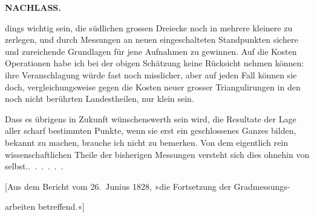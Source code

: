 \par\clearpage
\noindent{}\hfill{\small\textbf{NACHLASS.}}\hfill\null\par\medskip
\noindent dings wichtig sein, die südlichen grossen Dreiecke noch in mehrere kleinere
zu zerlegen, und durch Messungen an neuen eingeschalteten Standpunkten
sichere und zureichende Grundlagen für jene Aufnahmen zu gewinnen. Auf
die Kosten  Operationen habe ich bei der obigen Schätzung keine
Rücksicht nehmen können: ihre Veranschlagung würde fast noch misslicher,
aber auf jeden Fall können sie doch, vergleichungsweise gegen die Kosten
neuer grosser Triangulirungen in den noch nicht berührten Landestheilen, nur
klein sein.

Dass es übrigens in Zukunft wünschenswerth sein wird, die Resultate der
Lage aller scharf bestimmten Punkte, wenn sie erst ein geschlossenes Ganzes
bilden,  bekannt zu machen, brauche ich nicht zu bemerken. Von
dem eigentlich rein wissenschaftlichen Theile der bisherigen Messungen versteht
sich dies ohnehin von selbst.\quad\mbox{.\ .\ .\ .\ .\ .}

\bigskip
\begin{center}
[Aus dem Bericht vom 26.~Junius 1828, »die Fortsetzung der Gradmessungs-\par
arbeiten betreffend.«]
\end{center}


